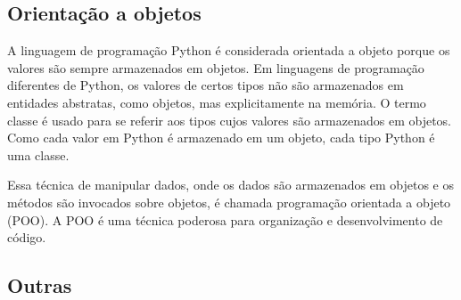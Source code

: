         \subsection{Orientação a objetos}
        A linguagem de programação Python é considerada orientada a objeto porque os valores são
        sempre armazenados em objetos. Em linguagens de programação diferentes de Python, os valores
        de certos tipos não são armazenados em entidades abstratas, como objetos, mas explicitamente na
        memória. O termo classe é usado para se referir aos tipos cujos valores são armazenados em
        objetos. Como cada valor em Python é armazenado em um objeto, cada tipo Python é uma classe. 
        
        Essa técnica de manipular dados, onde os dados são armazenados em objetos e os métodos são invocados sobre objetos, é chamada programação
        orientada a objeto (POO). A POO é uma técnica poderosa para organização e desenvolvimento
        de código. 

        \subsection{Outras} 